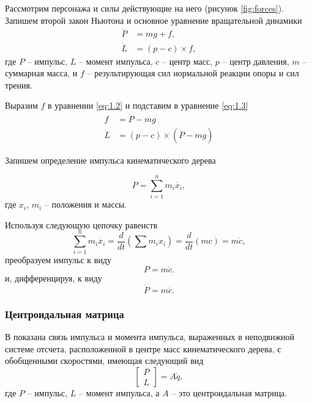 Рассмотрим персонажа и силы действующие на него (рисунок \ref{fig:forces}). Запишем второй закон Ньютона и основное уравнение вращательной динамики
\begin{align*}
\dot{P} &= mg + f, \tag{1.2}\label{eq:1.2} \\
\dot{L} &= (p - c) \times f, \tag{1.3}\label{eq:1.3}
\end{align*}
где $P$ -- импульс, $L$ -- момент импульса, $c$ -- центр масс, $p$ -- центр давления, $m$ -- суммарная масса, и $f$ -- результирующая сил нормальной реакции опоры и сил трения.

Выразим $f$ в уравнении \ref{eq:1.2} и подставим в уравнение \ref{eq:1.3}
\begin{align}
f &= \dot{P} - mg \tag{1.4}\label{eq:1.4} \\
\dot{L} &= (p - c) \times (\dot{P} - mg) \tag{1.5}\label{eq:1.5}
\end{align}

Запишем определение импульса кинематического дерева

\begin{equation}
P = \sum_{i = 1}^{n} m_{i} \dot{x_{i}},
\end{equation}
где $x_{i}$, $m_{i}$ -- положения и массы.

Используя следующую цепочку равенств
\begin{equation}
\sum_{i = 1}^{n} m_{i} \dot{x_{i}} = \frac{d}{dt} (\sum m_{i} x_{i}) = \frac{d}{dt} (mc) = m \dot{c},
\end{equation}
преобразуем импульс к виду
\begin{equation}
P = m \dot{c}.
\end{equation}
и, дифференцируя, к виду
\begin{equation}
  \dot{P} = m \ddot{c}.
\end{equation}

\subsubsection{Центроидальная матрица}


В \cite{OrinG} показана связь импульса и момента импульса, выраженных в неподвижной системе отсчета, расположенной в центре масс кинематического дерева, с обобщенными скоростями, имеющая следующий вид
\begin{equation}
\begin{bmatrix} P\\ L \end{bmatrix} = A \dot{q},
\end{equation}
где $P$ -- импульс, $L$ -- момент импульса, а $A$ -- это центроидальная матрица.

